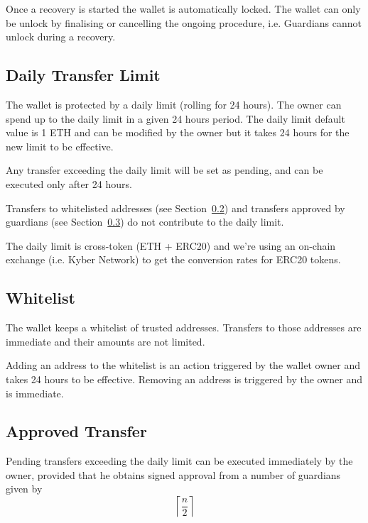 \documentclass[12pt]{article}
\begin{document}
Once a recovery is started the wallet is automatically locked. The wallet can only be unlock by finalising or cancelling the ongoing procedure, i.e. Guardians cannot unlock during a recovery.

\subsection{Daily Transfer Limit}
\label{sec:dailylimit}
The wallet is protected by a daily limit (rolling for 24 hours). The owner can spend up to the daily limit in a given 24 hours period. The daily limit default value is 1 ETH and can be modified by the owner but it takes 24 hours for the new limit to be effective.

Any transfer exceeding the daily limit will be set as pending, and can be executed only after 24 hours.

Transfers to whitelisted addresses (see Section~\ref{sec:whitelist}) and transfers approved by guardians (see Section~\ref{sec:approved-transfer}) do not contribute to the daily limit.

The daily limit is cross-token (ETH + ERC20) and we're using an on-chain exchange (i.e. Kyber Network) to get the conversion rates for ERC20 tokens.

\subsection{Whitelist}
\label{sec:whitelist}

The wallet keeps a whitelist of trusted addresses. Transfers to those addresses are immediate and their amounts are not limited.

Adding an address to the whitelist is an action triggered by the wallet owner and takes 24 hours to be effective. Removing an address is triggered by the owner and is immediate.

\subsection{Approved Transfer}
\label{sec:approved-transfer}

Pending transfers exceeding the daily limit can be executed immediately by the owner, provided that he obtains signed approval from a number of guardians given by
\begin{equation*}
    \left\lceil {\frac{n}{2}} \right\rceil
\end{equation*}
\end{document}
